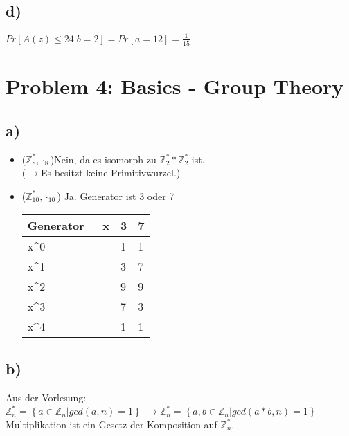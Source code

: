 \documentclass[12pt,pdftex,a4paper]{article}
\begin{document}
\subsection*{d)}
$Pr[A(z) \leq 24 | b = 2] = Pr[a = 12] = \frac{1}{15}$

\section*{Problem 4: Basics - Group Theory}
\subsection*{a)}
\begin{itemize}
	\item ($ \mathds{Z}^*_{8}, \cdot_{8} $)Nein, da es isomorph zu $ \mathds{Z}^*_2 * \mathds{Z}^*_2 $ ist.\\
	($ \rightarrow $Es besitzt keine Primitivwurzel.)
	\item ($ \mathds{Z}^*_{10}, \cdot_{10} $) Ja. Generator ist 3 oder 7\\
    \begin{table}[!ht]
    	\centering
    	\begin{tabular}{|l|l|l|}
    		\hline
    		Generator = x        & 3 & 7 \\ \hline
    		x\textasciicircum{}0 & 1 & 1 \\ \hline
    		x\textasciicircum{}1 & 3 & 7 \\ \hline
    		x\textasciicircum{}2 & 9 & 9 \\ \hline
    		x\textasciicircum{}3 & 7 & 3 \\ \hline
    		x\textasciicircum{}4 & 1 & 1 \\ \hline
    	\end{tabular}
    \end{table}
\end{itemize}

\subsection*{b)}

Aus der Vorlesung:\\
$ \mathds{Z}^*_n = \left\lbrace  a \in \mathds{Z}_n | gcd(a, n) = 1 \right\rbrace $
$ \rightarrow \mathds{Z}^*_n = \left\lbrace  a, b \in \mathds{Z}_n | gcd(a*b, n) = 1 \right\rbrace $\\
Multiplikation ist ein Gesetz der Komposition auf $ \mathds{Z}^*_n $.
\end{document}
